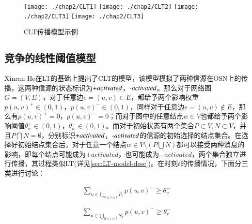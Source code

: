 \begin{figure}[H]
\centering%
	{\texttt{[image: ./chap2/CLT1]}}
	\hspace{1mm}%
	{\texttt{[image: ./chap2/CLT2]}}
	\hspace{1mm}%
	{\texttt{[image: ./chap2/CLT3]}}
	\hspace{1mm}%
	{\texttt{[image: ./chap2/CLT3]}}
	\caption{CLT传播模型示例}
	\label{fig:CLT-inf-diffusion}
\end{figure}


\subsection{竞争的线性阈值模型}
\label{sec:CLT-model-desc}
Xinran He\cite{he2012influence}在LT的基础上提出了CLT的模型，该模型模拟了两种信源在OSN上的传播，这两种信源的状态标识为$\emph{+activated}$，$\emph{-activated}$。那么对于网络图$G=(V,E)$，对于任意边$e=(u, v) \in E$，都给予两个影响权重$p(u,v)^{+} \in (0, 1)$，$p(u,v)^{-} \in (0, 1)$，同样对于任意边$e=(u,v) \notin E$，那么有$p(u,v)^{+}=0$，$p(u,v)^{-}=0$；而对于图中的任意结点$w \in V$也都给予两个影响阈值$\theta_{w}^{+} \in (0, 1)$，$\theta_{w}^{-} \in (0, 1)$。而对于初始状态有两个集合$P \subset V, N \subset V$，并且$P \bigcap N = \emptyset$，分别标识$\emph{+activated}$，$\emph{-activated}$的信源的初始选择的结点集合。在选择好初始结点集合后，对于任意一个结点$w \in V \setminus (P \bigcup N)$都可以接受两种消息的影响，即每个结点可能成为$+activated$，也可能成为$-activated$，两个集合独立进行传播，其过程类似LT(详见\ref{sec:LT-model-desc})。在时刻$t$的传播情况，下面分三类进行讨论：


\begin{equation}
\label{eq:positive-activated} 
	\begin{aligned}
		{\sum_{u \in \bigcup_{0 \leq i \leq t}P_{i}}p(u,v)^{+} \geq \theta_{v}^{+}}
	\end{aligned}
\end{equation}

\begin{equation} 
\label{eq:negative-activated} 
	\begin{aligned}
		{\sum_{u \in \bigcup_{0 \leq i \leq t}N_{i}}p(u,v)^{-} \geq \theta_{v}^{-}}
	\end{aligned}
\end{equation}


